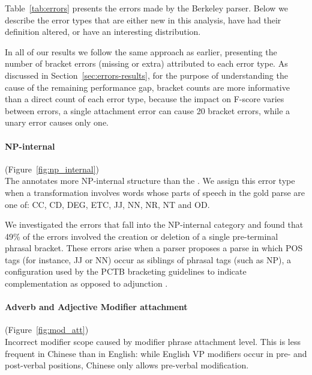 Table~\ref{tab:errors} presents the errors made by the Berkeley parser.
Below we describe the error types that are either new in this analysis, have had their definition altered, or have an interesting distribution.

In all of our results we follow the same approach as earlier, presenting the number of bracket errors (missing or extra) attributed to each error type.
As discussed in Section~\ref{sec:errors-results}, for the purpose of understanding the cause of the remaining performance gap, bracket counts are more informative than a direct count of each error type, because the impact on \parseval F-score varies between errors, \myeg a single attachment error can cause 20 bracket errors, while a unary error causes only one.

\begin{figure}
\begin{minipage}[b]{0.45\textwidth}
\centering

\end{minipage}\hfill
\begin{minipage}[b]{0.5\textwidth}
\centering

\end{minipage}
\end{figure}

\paragraph{NP-internal} (Figure~\ref{fig:np_internal}) \\
The \pctb annotates more NP-internal structure than the \ptb.
We assign this error type when a transformation involves words whose parts of speech in the gold parse are one of: CC, CD, DEG, ETC, JJ, NN, NR, NT and OD.

We investigated the errors that fall into the NP-internal category and found that 49\% of the errors involved the creation or deletion of a single pre-terminal phrasal bracket.
These errors arise when a parser proposes a parse in which POS tags (for instance, JJ or NN) occur as siblings of phrasal tags (such as NP), a configuration used by the PCTB bracketing guidelines to indicate complementation as opposed to adjunction \parencite{Xue:2005:NLE}.

\paragraph{Adverb and Adjective Modifier attachment} (Figure~\ref{fig:mod_att}) \\
Incorrect modifier scope caused by modifier phrase attachment level.
This is less frequent in Chinese than in English: while English VP modifiers occur in pre- and post-verbal positions, Chinese only allows pre-verbal modification.

